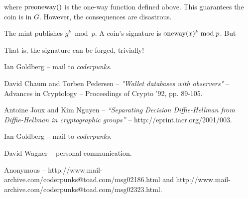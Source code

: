\documentclass[a4paper,titlepage]{article}
\begin{document}
where $\preoneway$ is the one-way function defined above. This guarantees
the coin is in $G$. However, the consequences are disastrous\cite{Wagner}.

The mint publishes $g^k \bmod p$. A coin's signature is $\textrm{oneway}(x)^k \bmod p$. But


That is, the signature can be forged, trivially!

\begin{thebibliography}{99}

	 Ian Goldberg -- mail to {\sl coderpunks}.

	 David Chaum and Torben Pedersen -- {\sl
	"Wallet databases with observers"} -- Advances in Cryptology
	-- Proceedings of Crypto '92, pp. 89-105.

	 Antoine Joux and Kim Nguyen -- {\sl
	``Separating Decision Diffie-Hellman from Diffie-Hellman in
	cryptographic groups''} -- http://eprint.iacr.org/2001/003.

	 Ian Goldberg -- mail to {\sl coderpunks}.

	 David Wagner -- personal communication.

	 Anonymous --
	http://www.mail-archive.com/coderpunks@toad.com/msg02186.html
	and
	http://www.mail-archive.com/coderpunks@toad.com/msg02323.html.

\end{thebibliography}
\end{document}
